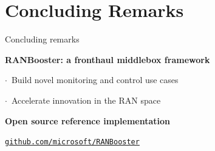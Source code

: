 
\section[Wrap-up]{Concluding Remarks}


\begin{frame}{Concluding remarks}
  \vspace{0.8em}
  {\small\textbf{RANBooster: a fronthaul middlebox framework}\par}
  \vspace{0.2em}
  {\small\hspace{1.0em}$\cdot$~Build novel monitoring and control use cases\par}
  {\small\hspace{1.0em}$\cdot$~Accelerate innovation in the RAN space\par}

  \vspace{0.7em}
  {\small\textbf{Open source reference implementation}\par}

  \vspace{0.7em}
  \centering
  \begin{tcolorbox}[colback=white,colframe=softgreen,boxrule=0.8pt,arc=2pt,
    left=6pt,right=6pt,top=4pt,bottom=4pt,width=0.78\textwidth]
    \centering\small
    \href{https://github.com/microsoft/RANBooster}{\texttt{github.com/microsoft/RANBooster}}
  \end{tcolorbox}

  \vspace{0.6em}
\end{frame}

